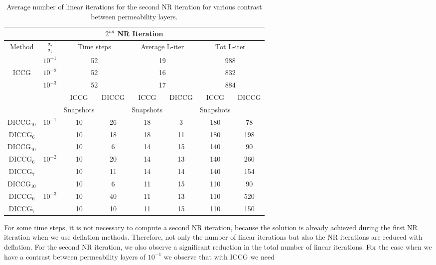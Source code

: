 \documentclass[12pt]{article}
\begin{document}
\begin{table}[!ht]\centering
\begin{minipage}{1\textwidth}
\vspace{-10pt}
\centering
\begin{tabular}{ |c|c|c|c|c|c|c|c|} 
  \hline
 \multicolumn{8}{|c|}{$2^{nd}$ NR Iteration}  \\
\hline
Method& $\frac{\sigma_2}{\sigma_1}$ & \multicolumn{2}{c|}{Time steps} &\multicolumn{2}{c|}{Average L-iter} & \multicolumn{2}{c|}{Tot L-iter}\\
\hline
&$10^{-1}$ &\multicolumn{2}{c|}{52} & \multicolumn{2}{c|}{19}& \multicolumn{2}{c|}{988} \\
ICCG&$10^{-2}$ & \multicolumn{2}{c|}{52}& \multicolumn{2}{c|}{16}& \multicolumn{2}{c|}{832}\\
&$10^{-3}$ & \multicolumn{2}{c|}{52} &\multicolumn{2}{c|}{17} & \multicolumn{2}{c|}{884}\\
\hline
&&ICCG&DICCG&ICCG&DICCG&ICCG&DICCG\\
&&Snapshots&&Snapshots&&Snapshots&\\
\hline
DICCG$_{10}$&$10^{-1}$ &10&26 &18&3 &180&78 \\
DICCG$_6$& &10&18 &18&11 &180&198 \\
\hline
DICCG$_{10}$& &10&6 & 14&15& 140&90\\
DICCG$_6$&$10^{-2}$ &10&20 & 14&13& 140&260\\
DICCG$_7$&&10&11 & 14&14& 140&154\\
\hline
DICCG$_{10}$& & 10&6 & 11&15&110&90 \\
DICCG$_6$&$10^{-3}$ & 10&40 & 11&13&110&520 \\
DICCG$_7$& & 10&10 & 11&15&110&150 \\
 \hline
 \end{tabular}
\caption{Average number of linear iterations for the second NR iteration for various contrast between permeability layers. }\label{table:liter2}
\end{minipage}
\end{table}
For some time steps, it is not necessary to compute a second NR iteration, because the solution is already achieved
during the first NR iteration when we use deflation methods. Therefore, not only the number of linear iterations
but also the NR iterations are reduced with deflation.
For the second NR iteration, we also observe a significant reduction in the total number of linear iterations.
For the case when we have a contrast between permeability layers of $10^{-1}$ we observe that with ICCG we need
\end{document}
